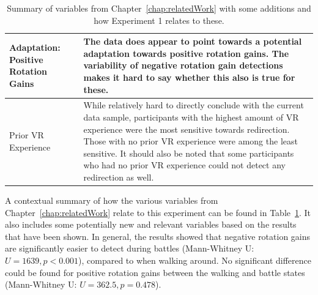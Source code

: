\begin{table}[h!]
{\begin{tabularx}{\textwidth}{|X|X|}
Adaptation: Positive Rotation Gains & The data does appear to point towards a potential adaptation towards positive rotation gains. The variability of negative rotation gain detections makes it hard to say whether this also is true for these. \\
\hline
Prior VR Experience & While relatively hard to directly conclude with the current data sample, participants with the highest amount of VR experience were the most sensitive towards redirection. Those with no prior VR experience were among the least sensitive. It should also be noted that some participants who had no prior VR experience could not detect any redirection as well. \\
\hline
\end{tabularx}}
\caption[Experiment 1: Summary Over Contextual Variables in Relation To Detection Thresholds]{Summary of variables from Chapter~\ref{chap:relatedWork} with some additions and how Experiment 1 relates to these.}
\label{table:ex1VariableSummary}
\end{table}

A contextual summary of how the various variables from Chapter~\ref{chap:relatedWork} relate to this experiment can be found in Table~\ref{table:ex1VariableSummary}. It also includes some potentially new and relevant variables based on the results that have been shown. In general, the results showed that negative rotation gains are significantly easier to detect during battles (Mann-Whitney U: $U = 1639, p < 0.001$), compared to when walking around. No significant difference could be found for positive rotation gains between the walking and battle states (Mann-Whitney U: $U = 362.5, p = 0.478$). 